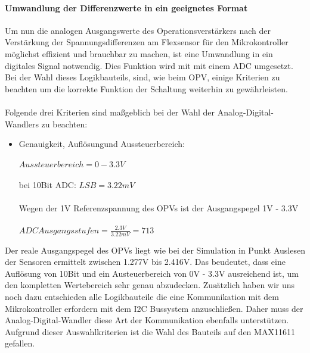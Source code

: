 \documentclass[titlepage,12pt,twoside]{article}
\begin{document}
\paragraph{Umwandlung der Differenzwerte in ein geeignetes Format}
\hfill \break
\hfill \break
Um nun die analogen Ausgangswerte des Operationsverstärkers nach der Verstärkung der Spannungsdifferenzen am Flexsensor für
den Mikrokontroller möglichst effizient und brauchbar zu machen, ist eine Umwandlung in ein digitales Signal notwendig.
Dies Funktion wird mit mit einem ADC umgesetzt. Bei der Wahl dieses Logikbauteils, sind, wie beim OPV, einige Kriterien zu 
beachten um die korrekte Funktion der Schaltung weiterhin zu gewährleisten. \\
\\
Folgende drei Kriterien sind maßgeblich bei der Wahl der Analog-Digital-Wandlers zu beachten:
\begin{itemize}
	\item Genauigkeit, Auflösungund Aussteuerbereich: \\
		  \\
		  \hspace*{1cm} $ Aussteuerbereich = 0 - 3.3V $ \\
		  \\
		  \hspace*{1cm} bei 10Bit ADC: $ LSB = 3.22mV $ \\
		  \\
		  \hspace*{1cm} Wegen der 1V Referenzspannung des OPVs ist der Ausgangspegel 1V - 3.3V \\
		  \\
		  \hspace*{1cm} $ ADC Ausgangsstufen = \frac{2.3V}{3.22mV} = 713 $ \\
\end{itemize}
Der reale Ausgangspegel des OPVs liegt wie bei der Simulation in Punkt Auslesen der Sensoren ermittelt zwischen 1.277V bis 2.416V.
Das beudeutet, dass eine Auflösung von 10Bit und ein Austeuerbereich von 0V - 3.3V ausreichend ist, um den kompletten Wertebereich
sehr genau abzudecken. Zusätzlich haben wir uns noch dazu entschieden alle Logikbauteile die eine Kommunikation mit dem Mikrokontroller
erfordern mit dem I2C Bussystem anzuschließen. Daher muss der Analog-Digital-Wandler diese Art der Kommunikation ebenfalls unterstützen.
Aufgrund dieser Auswahlkriterien ist die Wahl des Bauteils auf den MAX11611 gefallen.\\
\\
\end{document}
